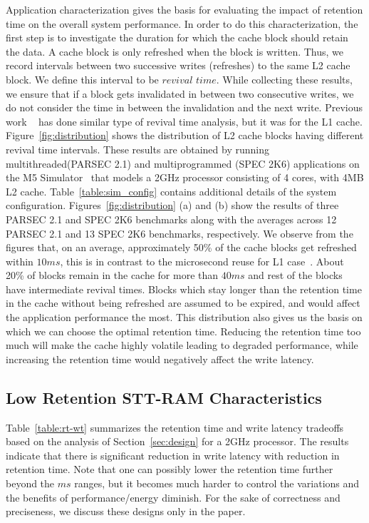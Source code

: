 Application characterization gives the basis for evaluating the impact of retention time on the
overall system performance. In order to do this characterization, the first step is to investigate
the duration for which the cache block should retain the data.  A cache block is only refreshed when
the block is written. Thus, we record intervals between two successive writes (refreshes) to the same
L2 cache block. We define this interval to be $revival$ $time$. While collecting these results, we
ensure that if a block gets invalidated in between two consecutive writes, we do not consider the
time in between the invalidation and the next write. Previous work ~\cite{3t1d-cache} has done
similar type of revival time analysis, but it was for the L1 cache. Figure~\ref{fig:distribution}
shows the distribution of L2 cache blocks having different revival time intervals. These results are
obtained by running multithreaded(PARSEC 2.1) and multiprogrammed (SPEC 2K6)
applications on the M5 Simulator~\cite{M5} that models a 2GHz processor consisting of 4 cores, with
4MB L2 cache. Table~\ref{table:sim_config} contains additional details of the system configuration.
Figures~\ref{fig:distribution} (a) and (b) show the results of three PARSEC 2.1
and SPEC 2K6 benchmarks along
with the averages across 12 PARSEC 2.1  and 13 SPEC 2K6 benchmarks, respectively. We observe from the figures
that, on an average, approximately 50\% of the cache blocks get refreshed within $10ms$, this is
in contrast to the microsecond reuse for L1 case~\cite{3t1d-cache}. About 20\% of blocks remain in
the cache for more than $40ms$ and rest of the blocks have intermediate revival times. Blocks
which stay longer than the retention time in the cache without being refreshed are assumed to be
expired, and would affect the application performance the most. This distribution also gives us the
basis on which we can choose the optimal retention time. Reducing the retention time too much will
make the cache highly volatile leading to degraded performance, while increasing the retention time
would negatively affect the write latency.



\subsection{Low Retention STT-RAM Characteristics}
Table~\ref{table:rt-wt} summarizes the retention time and write latency tradeoffs based on the analysis of Section~\ref{sec:design}
for a 2GHz processor.
The results indicate that there is significant reduction in write latency with reduction in retention time.
Note that one can possibly lower the retention time further beyond the $ms$ ranges, but it becomes much harder to control the variations and the benefits of performance/energy diminish. For the sake of correctness and preciseness, we discuss these designs only in the paper.

